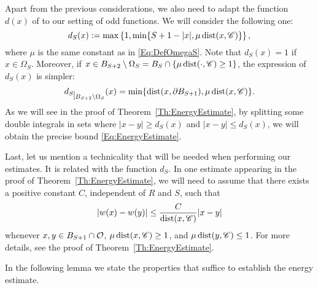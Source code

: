 Apart from the previous considerations, we also need to adapt the function $d(x)$ of \cite{SavinValdinoci-EnergyEstimate} to our setting of odd functions. We will consider the following one: 
$$ 
d_S(x) := \max\left\{1,\min\{S+1-|x|,\mu \operatorname{dist}(x,\mathscr{C})\} \right\},  
$$
where $\mu$ is the same constant as in \eqref{Eq:DefOmegaS}. Note that $d_S(x) = 1$ if $x\in \Omega_S$. Moreover, if $x\in B_{S+2}\setminus \Omega_S = B_S \cap \{\mu\operatorname{dist}(\cdot,\mathscr{C}) \geq 1\}$,  the expression of $d_S(x)$ is simpler:
\begin{align*}
     \restr{d_S}{B_{S+2}\setminus \Omega_S} (x) 
	 = \min \{\dist(x, \partial B_{S+1}),\mu \dist(x,\ccal)\} .
\end{align*}
As we will see in the proof of Theorem~\ref{Th:EnergyEstimate}, by splitting some double integrals in sets where $|x-y|\geq d_S(x)$ and $|x-y|\leq d_S(x)$, we will obtain the precise bound \eqref{Eq:EnergyEstimate}. 

Last, let us mention a technicality that will be needed when performing our estimates. It is related with the function $d_S$. In one estimate appearing in the proof of Theorem~\ref{Th:EnergyEstimate}, we will need to assume that there exists a positive constant $C$, independent of $R$ and $S$, such that
$$ 
|w(x)-w(y)| \leq \frac{C}{\operatorname{dist}(x,\mathscr{C})}|x-y| 
$$
whenever $x,y \in B_{S+1}\cap \mathcal{O}$, $\mu \operatorname{dist}(x,\mathscr{C})\geq 1$, and $\mu \operatorname{dist}(y,\mathscr{C})\leq 1$. For more details, see the proof of Theorem~\ref{Th:EnergyEstimate}.

In the following lemma we state the properties that suffice to establish the energy estimate.

